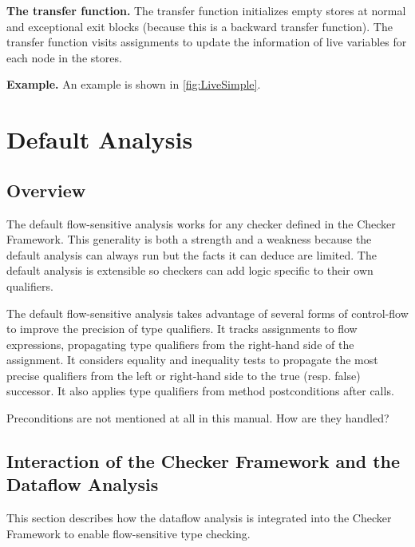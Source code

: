 \textbf{The transfer function.} The transfer function 
initializes empty stores at normal and exceptional exit blocks (because this
is a backward transfer function). The transfer function visits assignments to
update the information of live variables for each node in the stores.

\textbf{Example.} An example is shown in \autoref{fig:LiveSimple}.



\section{Default Analysis}


\subsection{Overview}

The default flow-sensitive analysis 
works for any checker defined in the
Checker Framework.  This generality is both a strength and a weakness
because the default analysis can always run but the facts it can
deduce are limited.  The default analysis is extensible so checkers
can add logic specific to their own qualifiers.

The default flow-sensitive analysis takes advantage of several forms
of control-flow to improve the precision of type qualifiers.  It
tracks assignments to flow expressions, propagating type qualifiers
from the right-hand side of the assignment.  It considers equality and
inequality tests to propagate the most precise qualifiers from the
left or right-hand side to the true (resp. false) successor.  It also
applies type qualifiers from method postconditions after calls.

\begin{workinprogress}
Preconditions are not mentioned at all in this manual. How are they handled?
\end{workinprogress}


\subsection{Interaction of the Checker Framework and the Dataflow Analysis}
\label{sec:flow-cf-interaction}

This section describes how the dataflow analysis is integrated into the
Checker Framework to enable flow-sensitive type checking.

